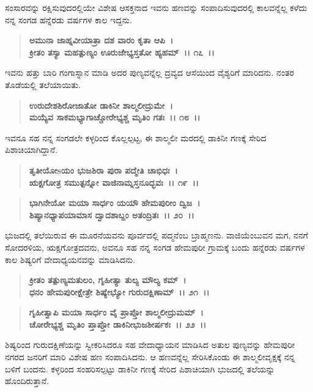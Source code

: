 ಸಂಸಾರವನ್ನು ರಕ್ಷಿಸುವುದರಲ್ಲಿಯೇ ವಿಶೇಷ ಆಸಕ್ತನಾದ ಇವನು ಹಣವನ್ನು ಸಂಪಾದಿಸುವುದರಲ್ಲಿ ಕಾಲವನ್ನೆಲ್ಲ ಕಳೆದು ನನ್ನ ಸಂಗಡ ಹನ್ನೆರಡು ವರ್ಷಗಳ ಕಾಲ ಇದ್ದನು.

\begin{verse}
\textbf{ಅಮುನಾ ಜಾಹ್ನವೀಯಾತ್ರಾ ದಶ ವಾರಂ ಕೃತಾ ಆಪಿ~।}\\\textbf{ಕ್ರೀತಂ ತಸ್ಯಾ ಮಹತ್ಪುಣ್ಯಂ ಊರುಜೇಭ್ಯಸ್ತತೋ ಹ್ಯಹಮ್~।। ೧೭~।।}
\end{verse}

ಇವನು ಹತ್ತು ಬಾರಿ ಗಂಗಾಸ್ನಾನ ಮಾಡಿ ಅದರ ಪುಣ್ಯವನ್ನೆಲ್ಲ ದ್ರವ್ಯದ ಆಸೆಯಿಂದ ವೈಶ್ಯರಿಗೆ ಮಾರಿದನು. ನಂತರ ತೊಡೆಯಲ್ಲಿ ತಲೆಯಾಯಿತು.

\begin{verse}
\textbf{ಉರುದೇಶಶಿರೋಜಾತೋ ಡಾಕಿನೀ ಶಾಲ್ಮಲೀದ್ರುಮೇ~।}\\\textbf{ಮಯ್ಯೆವ ಸಾಕಮಭ್ಯಾಗಾಚ್ಚೋರೇಭ್ಯಶ್ಚ ಮೃತಿಂ ಗತಃ~।। ೧೮~।।}
\end{verse}

ಇವನೂ ಸಹ ನನ್ನ ಸಂಗಡಲೇ ಕಳ್ಳರಿಂದ ಕೊಲ್ಲಲ್ಪಟ್ಟ, ಈ ಶಾಲ್ಮಲೀ ಮರದಲ್ಲಿ ಡಾಕಿನೀ ಗಣಕ್ಕೆ ಸೇರಿದ ಪಿಶಾಚಿಯಾಗಿದ್ದಾನೆ.

\begin{verse}
\textbf{ತೃತೀಯೋsಯಂ ಭುಜಶಿರಾ ಪುರಾ ಪದ್ಮೇತಿ ಚಾಭಿಧಃ~।}\\\textbf{ಋಕ್ಷಗೋತ್ರ ಸಮುತ್ಪನ್ನೋ ವಾಜಿನಾಮ್ನಸ್ತನೂದ್ಭವಃ~।। ೧೯~।।}
\end{verse}

\begin{verse}
\textbf{ಭಾಗಿನೇಯೋ ಮಯಾ ಸಾರ್ಧಂ ಯಯೌ ಹೇಮಪುರೀಂ ದ್ವಿಜ~।}\\\textbf{ಶಿಷ್ಯಾನಧ್ಯಾಪಯಾಮಾಸ ದ್ವಾದಶಾಬ್ದಂ ಅತಂದ್ರಿತಃ~।। ೨೦~।।}
\end{verse}

ಭುಜದಲ್ಲಿ ತಲೆಯಿರುವ ಈ ಮೂರನೆಯವನು ಪೂರ್ವದಲ್ಲಿ ಪದ್ಮನೆಂಬ ಬ್ರಾಹ್ಮಣನು. ವಾಜಿಯೆಂಬುವನ ಮಗ, ನನಗೆ ಸೋದರಳಿಯ, ಋಕ್ಷಗೋತ್ರದವನು, ಅವನೂ ಸಹ ನನ್ನ ಸಂಗಡ ಹೇಮಪುರೀ ಗ್ರಾಮಕ್ಕೆ ಬಂದು ಹನ್ನೆರಡು ವರ್ಷಗಳ ಕಾಲ ಶಿಷ್ಯರಿಗೆ ವೇದಾಧ್ಯಯನವನ್ನು ಮಾಡಿಸಿದನು.

\begin{verse}
\textbf{ಕ್ರೀತಂ ತತ್ಪುಣ್ಯಮತುಲಂ, ಗೃಹೀತ್ಯಾ ತುಲ್ಯ ಮೌಲ್ಯ ಕಮ್~।}\\\textbf{ಧನಂ ಹೇಮಪುರೀಕ್ಷೇತ್ರೇ ಶಿಷ್ಯೇಭ್ಯೋ ಗುರುದಕ್ಷಿಣಾಮ್~।। ೨೧~।।} 
\end{verse}

\begin{verse}
\textbf{ಗೃಹೀತ್ವಾಪಿ ಮಯಾ ಸಾರ್ಧಂ ವೈ ಪ್ರಾಪ್ತೋ ಶಾಲ್ಮಲೀದ್ರುಮಮ್~।}\\\textbf{ಚೋರೇಭ್ಯಶ್ಚ ಮೃತಿಂ ಪ್ತಾಪ್ತೋ ಡಾಕಿನೀಭುಜಶೀರ್ಷಕಃ~।। ೨೨~।।}
\end{verse}

ಶಿಷ್ಯರಿಂದ ಗುರುದಕ್ಷಿಣೆಯನ್ನು ಸ್ವೀಕರಿಸಿದರೂ ಸಹ ವೇದಾಧ್ಯಾಯನ ಮಾಡಿಸಿದ ಅತುಲ ಪುಣ್ಯವನ್ನು ಹೇಮಪುರೀ ನಗರದ ಜನರಿಗೆ ಮಾರಿ ವಿಶೇಷ ಹಣ ಸಂಪಾದಿಸಿದನು. ಆ ಹಣವನ್ನೆಲ್ಲ ಸೇರಿಸಿಕೊಂಡು ಈ ಶಾಲ್ಮಲೀವೃಕ್ಷಕ್ಕೆ ನನ್ನ ಬಳಿಗೆ ಬಂದನು. ಕಳ್ಳರಿಂದ ಸಂಹರಿಸಲ್ಪಟ್ಟು ಡಾಕಿನೀ ಗಣಕ್ಕೆ ಸೇರಿದ ಪಿಶಾಚಿಯಾಗಿ ಭುಜದಲ್ಲಿ ತಲೆಯನ್ನು ಹೊಂದಿರುತ್ತಾನೆ.

